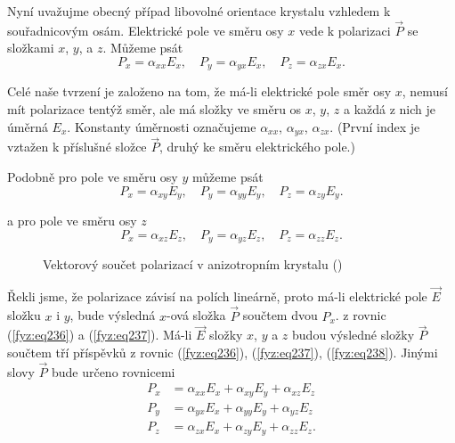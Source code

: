     Nyní uvažujme obecný případ libovolné orientace krystalu vzhledem k souřadnicovým osám.
    Elektrické pole ve směru osy \(x\) vede k polarizaci \(\vec{P}\) se složkami \(x\), \(y\), a
    \(z\). Můžeme psát
    \begin{equation}\label{fyz:eq236}
      P_x = \alpha_{xx}E_x, \quad P_y = \alpha_{yx}E_x, \quad  P_z = \alpha_{zx}E_x.
    \end{equation}

    Celé naše tvrzení je založeno na tom, že má-li elektrické pole směr osy \(x\), nemusí mít
    polarizace tentýž směr, ale má složky ve směru os \(x\), \(y\), \(z\) a každá z nich je úměrná
    \(E_x\). Konstanty úměrnosti označujeme \(\alpha_{xx}\), \(\alpha_{yx}\), \(\alpha_{zx}\).
    (První index je vztažen k příslušné složce \(\vec{P}\), druhý ke směru elektrického pole.) 
    
    Podobně pro pole ve směru osy \(y\) můžeme psát
    \begin{equation}\label{fyz:eq237}
      P_x = \alpha_{xy}E_y, \quad P_y = \alpha_{yy}E_y, \quad  P_z = \alpha_{zy}E_y.
    \end{equation}

    a pro pole ve směru osy \(z\)
    \begin{equation}\label{fyz:eq238}
      P_x = \alpha_{xz}E_z, \quad P_y = \alpha_{yz}E_z, \quad  P_z = \alpha_{zz}E_z.
    \end{equation}

    \begin{figure}[ht!]   %
      \centering
      \caption{Vektorový součet polarizací v anizotropním krystalu (\cite[s.~748]{Feynman02})}
      \label{fyz:fig874}
    \end{figure}

    Řekli jsme, že polarizace závisí na polích lineárně, proto má-li elektrické pole \(\vec{E}\)
    složku \(x\) i \(y\), bude výsledná \(x\)-ová složka \(\vec{P}\) součtem dvou \(P_x\). z rovnic
    (\ref{fyz:eq236}) a (\ref{fyz:eq237}). Má-li \(\vec{E}\) složky \(x\), \(y\) a \(z\) budou
    výsledné složky \(\vec{P}\) součtem tří příspěvků z rovnic (\ref{fyz:eq236}),
    (\ref{fyz:eq237}), (\ref{fyz:eq238}). Jinými slovy \(\vec{P}\) bude určeno rovnicemi
    \begin{align}\label{fyz:eq240}
      P_x &= \alpha_{xx}E_x + \alpha_{xy}E_y + \alpha_{xz}E_z  \nonumber \\
      P_y &= \alpha_{yx}E_x + \alpha_{yy}E_y + \alpha_{yz}E_z            \\
      P_z &= \alpha_{zx}E_x + \alpha_{zy}E_y + \alpha_{zz}E_z. \nonumber
    \end{align}


